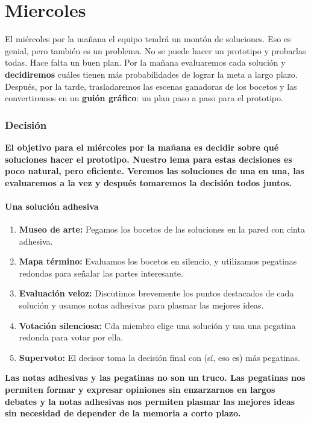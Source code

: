 \documentclass[10pt]{article}
\begin{document}
\part*{ \center Miercoles}
El miércoles por la mañana el equipo tendrá un montón de soluciones. Eso es genial, pero también es un problema. No se puede hacer un prototipo y probarlas todas. Hace falta un buen plan. Por la mañana evaluaremos cada solución y \textbf{decidiremos} cuáles tienen más probabilidades de lograr la meta a largo plazo. Después, por la tarde, trasladaremos las escenas ganadoras de los bocetos y las convertiremos en un \textbf{guión gráfico}: un plan paso a paso para el prototipo.
\begin{multicols}{2}
\section*{Decisión}
\textbf{El objetivo para el miércoles por la mañana es decidir sobre qué soluciones hacer el prototipo. Nuestro lema para estas decisiones es poco natural, pero eficiente. Veremos las soluciones de una en una, las evaluaremos a la vez y después tomaremos la decisión todos juntos.}
\subsection*{Una solución adhesiva}
\begin{enumerate}[\bfseries 1.]
\item \textbf{Museo de arte:} Pegamos los bocetos de las soluciones en la pared con cinta adhesiva.
\item \textbf{Mapa término:} Evaluamos los bocetos en silencio, y utilizamos pegatinas redondas para señalar las partes interesante.
\item \textbf{Evaluación veloz:} Discutimos brevemente los puntos destacados de cada solución y usamos notas adhesivas para plasmar las mejores ideas.
\item \textbf{Votación silenciosa:} Cda miembro elige una solución y usa una pegatina redonda para votar por ella.
\item \textbf{Supervoto:} El decisor toma la decisión final con (sí, eso es) más pegatinas.
\end{enumerate}
\textbf{Las notas adhesivas y las pegatinas no son un truco. Las pegatinas nos permiten formar y expresar opiniones sin enzarzarnos en largos debates y la notas adhesivas nos permiten plasmar las mejores ideas sin necesidad de depender de la memoria a corto plazo.}

\end{multicols}
\end{document}
